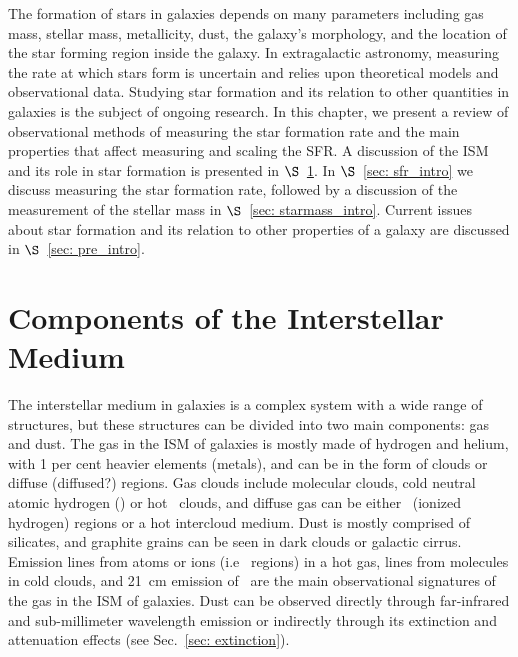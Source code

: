 The formation of stars in galaxies depends on many parameters including gas mass, stellar mass, metallicity, dust, the galaxy's morphology, and the location of the star forming region inside the galaxy.
In extragalactic astronomy, measuring the rate at which stars form is uncertain and relies upon theoretical models and observational data.
Studying star formation and its relation to other quantities in galaxies is the subject of ongoing research.
In this chapter, we present a review of observational methods of measuring the star formation rate and the main properties that affect measuring and scaling the SFR. A discussion of the ISM and its role in star formation is presented in $\S$~\ref{sec: ism_intro}. In $\S$~\ref{sec: sfr_intro} we discuss measuring the star formation rate, followed by a discussion of the measurement of the stellar mass in $\S$~\ref{sec: starmass_intro}. Current issues about star formation and its relation to other properties of a galaxy are discussed in $\S$~\ref{sec: pre_intro}. 




\section{Components of the Interstellar Medium} 
\label{sec: ism_intro}
The interstellar medium in galaxies is a complex system with a wide range of structures, but these structures can be divided into two main components: gas and dust.
The gas in the ISM of galaxies is mostly made of hydrogen and helium, with 1 per cent heavier elements (metals), and can be in the form of clouds or diffuse (diffused?) regions.
Gas clouds include molecular clouds, cold neutral atomic hydrogen (\hi) or hot \hi~clouds, and diffuse gas can be either \hii~(ionized hydrogen) regions or a hot intercloud medium.
Dust is mostly comprised of silicates, and graphite grains can be seen in dark clouds or galactic cirrus.
Emission lines from atoms or ions (i.e \hii~regions) in a hot gas, lines from molecules in cold clouds, and 21~cm emission of \hi~are the main observational signatures of the gas in the ISM of galaxies.
Dust can be observed directly through far-infrared and sub-millimeter wavelength emission or indirectly through its extinction and attenuation effects (see Sec.~\ref{sec: extinction}).

